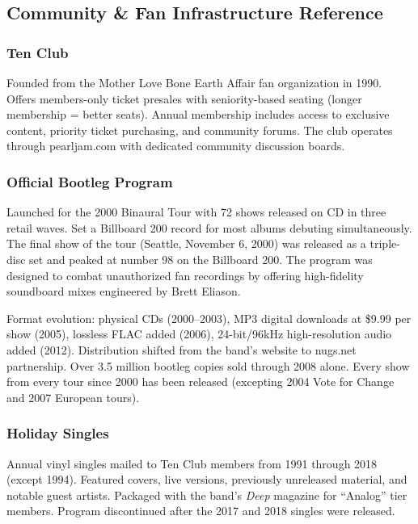 \documentclass[11pt,letterpaper]{article}
\begin{document}
\subsection{Community \& Fan Infrastructure Reference}

\subsubsection{Ten Club}

Founded from the Mother Love Bone Earth Affair fan organization in 1990. Offers members-only ticket presales with seniority-based seating (longer membership = better seats). Annual membership includes access to exclusive content, priority ticket purchasing, and community forums. The club operates through pearljam.com with dedicated community discussion boards.

\subsubsection{Official Bootleg Program}

Launched for the 2000 Binaural Tour with 72 shows released on CD in three retail waves. Set a Billboard 200 record for most albums debuting simultaneously. The final show of the tour (Seattle, November 6, 2000) was released as a triple-disc set and peaked at number 98 on the Billboard 200. The program was designed to combat unauthorized fan recordings by offering high-fidelity soundboard mixes engineered by Brett Eliason.

Format evolution: physical CDs (2000--2003), MP3 digital downloads at \$9.99 per show (2005), lossless FLAC added (2006), 24-bit/96kHz high-resolution audio added (2012). Distribution shifted from the band's website to nugs.net partnership. Over 3.5 million bootleg copies sold through 2008 alone. Every show from every tour since 2000 has been released (excepting 2004 Vote for Change and 2007 European tours).

\subsubsection{Holiday Singles}

Annual vinyl singles mailed to Ten Club members from 1991 through 2018 (except 1994). Featured covers, live versions, previously unreleased material, and notable guest artists. Packaged with the band's \textit{Deep} magazine for ``Analog'' tier members. Program discontinued after the 2017 and 2018 singles were released.
\end{document}
